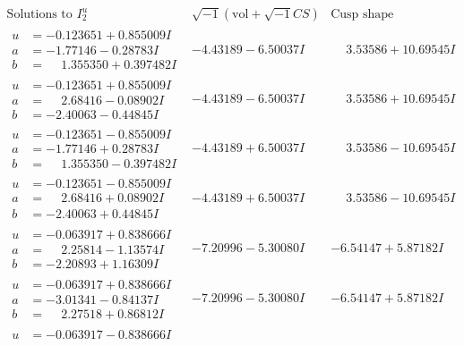 \documentclass[1p]{elsarticle_modified}
\theoremstyle{definition}
\newcommand{\I}{\sqrt{-1}}
\begin{document}
$$\begin{array}{c|c|c}  
\text{Solutions to }I^u_{2}& \I (\text{vol} + \sqrt{-1}CS) & \text{Cusp shape}\\
 \hline 
\begin{aligned}
u &= -0.123651 + 0.855009 I \\
a &= -1.77146 - 0.28783 I \\
b &= \phantom{-}1.355350 + 0.397482 I\end{aligned}
 & -4.43189 - 6.50037 I & \phantom{-}3.53586 + 10.69545 I \\ \hline\begin{aligned}
u &= -0.123651 + 0.855009 I \\
a &= \phantom{-}2.68416 - 0.08902 I \\
b &= -2.40063 - 0.44845 I\end{aligned}
 & -4.43189 - 6.50037 I & \phantom{-}3.53586 + 10.69545 I \\ \hline\begin{aligned}
u &= -0.123651 - 0.855009 I \\
a &= -1.77146 + 0.28783 I \\
b &= \phantom{-}1.355350 - 0.397482 I\end{aligned}
 & -4.43189 + 6.50037 I & \phantom{-}3.53586 - 10.69545 I \\ \hline\begin{aligned}
u &= -0.123651 - 0.855009 I \\
a &= \phantom{-}2.68416 + 0.08902 I \\
b &= -2.40063 + 0.44845 I\end{aligned}
 & -4.43189 + 6.50037 I & \phantom{-}3.53586 - 10.69545 I \\ \hline\begin{aligned}
u &= -0.063917 + 0.838666 I \\
a &= \phantom{-}2.25814 - 1.13574 I \\
b &= -2.20893 + 1.16309 I\end{aligned}
 & -7.20996 - 5.30080 I & -6.54147 + 5.87182 I \\ \hline\begin{aligned}
u &= -0.063917 + 0.838666 I \\
a &= -3.01341 - 0.84137 I \\
b &= \phantom{-}2.27518 + 0.86812 I\end{aligned}
 & -7.20996 - 5.30080 I & -6.54147 + 5.87182 I \\ \hline\begin{aligned}
u &= -0.063917 - 0.838666 I \\

\end{aligned}
\end{array}$$
\end{document}

